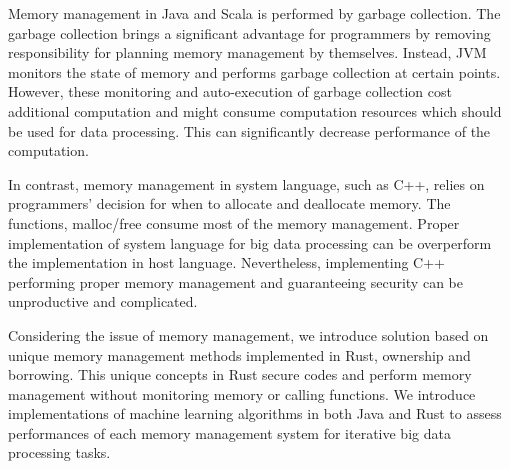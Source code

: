 Memory management in Java and Scala is performed by garbage collection. 
The garbage collection brings a significant advantage for programmers by removing responsibility
for planning memory management by themselves. Instead, JVM monitors the state of memory and performs garbage
collection at certain points. However, these monitoring and auto-execution of garbage collection cost additional 
computation and might consume computation resources which should be used for data processing. This can significantly decrease performance of the computation. 

In contrast, memory management in system language, such as C++, relies on programmers’ decision for when to allocate and deallocate memory. 
The functions, malloc/free consume most of the memory management. Proper implementation of system language for big data processing can be overperform the implementation in host language.
Nevertheless, implementing C++ performing proper memory management and guaranteeing security can be unproductive and complicated. 

Considering the issue of memory management, we introduce solution based on unique memory management methods implemented in Rust, ownership and borrowing.
This unique concepts in Rust secure codes and perform memory management without monitoring memory or calling functions. We introduce implementations of
machine learning algorithms in both Java and Rust to assess performances of each memory management system for iterative big data processing tasks.



